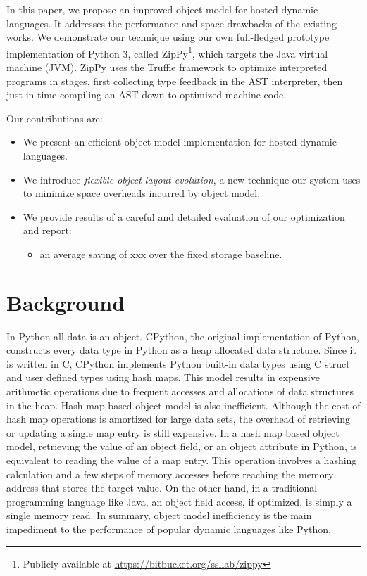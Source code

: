 In this paper, we propose an improved object model for hosted dynamic languages.
It addresses the performance and space drawbacks of the existing works.
We demonstrate our technique using our own full-fledged prototype implementation of Python 3, called ZipPy\footnote{Publicly available at \url{https://bitbucket.org/ssllab/zippy}}, which targets the Java virtual machine (JVM).
ZipPy uses the Truffle framework to optimize interpreted programs in stages, first collecting type feedback in the AST interpreter, then just-in-time compiling an AST down to optimized machine code.

\noindent{}Our contributions are:

\begin{itemize}

\item We present an efficient object model implementation for hosted dynamic languages.

\item We introduce \emph{flexible object layout evolution}, a new technique our system uses to minimize space overheads incurred by object model.

\item We provide results of a careful and detailed evaluation of our optimization and report:
  \begin{itemize}
  \item an average saving of xxx over the fixed storage baseline.
  \end{itemize}
\end{itemize}

\section{Background}
\label{sec:background}

In Python all data is an object.
CPython, the original implementation of Python, constructs every data type in Python as a heap allocated data structure.
Since it is written in C, CPython implements Python built-in data types using C struct and user defined types using hash maps.
This model results in expensive arithmetic operations due to frequent accesses and allocations of data structures in the heap.
Hash map based object model is also inefficient.
Although the cost of hash map operations is amortized for large data sets, the overhead of retrieving or updating a single map entry is still expensive.
In a hash map based object model, retrieving the value of an object field, or an object attribute in Python, is equivalent to reading the value of a map entry.
This operation involves a hashing calculation and a few steps of memory accesses before reaching the memory address that stores the target value.
On the other hand, in a traditional programming language like Java, an object field access, if optimized, is simply a single memory read.
In summary, object model inefficiency is the main impediment to the performance of popular dynamic languages like Python.


